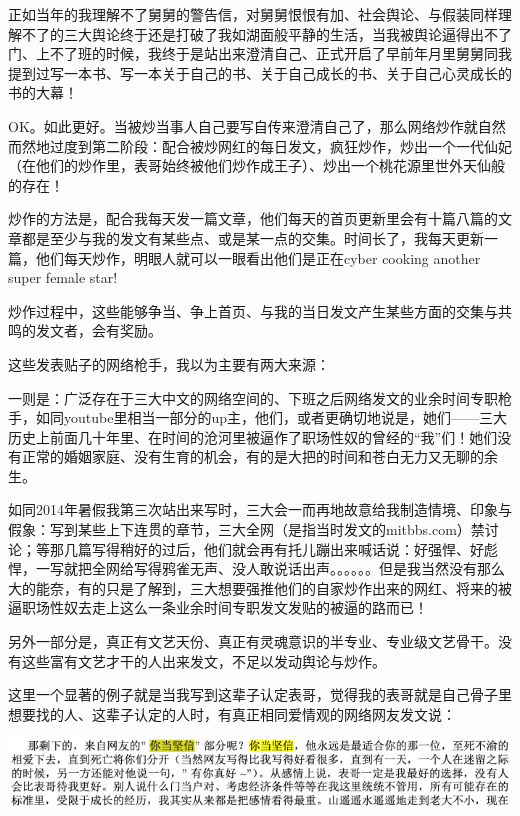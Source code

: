 \documentclass[9pt, b5paper]{article}
\begin{document}
正如当年的我理解不了舅舅的警告信，对舅舅恨恨有加、社会舆论、与假装同样理解不了的三大舆论终于还是打破了我如湖面般平静的生活，当我被舆论逼得出不了门、上不了班的时候，我终于是站出来澄清自己、正式开启了早前年月里舅舅同我提到过写一本书、写一本关于自己的书、关于自己成长的书、关于自己心灵成长的书的大幕！

OK。如此更好。当被炒当事人自己要写自传来澄清自己了，那么网络炒作就自然而然地过度到第二阶段：配合被炒网红的每日发文，疯狂炒作，炒出一个一代仙妃（在他们的炒作里，表哥始终被他们炒作成王子）、炒出一个桃花源里世外天仙般的存在！

炒作的方法是，配合我每天发一篇文章，他们每天的首页更新里会有十篇八篇的文章都是至少与我的发文有某些点、或是某一点的交集。时间长了，我每天更新一篇，他们每天炒作，明眼人就可以一眼看出他们是正在cyber cooking another super female star!

炒作过程中，这些能够争当、争上首页、与我的当日发文产生某些方面的交集与共鸣的发文者，会有奖励。 

这些发表贴子的网络枪手，我以为主要有两大来源：

一则是：广泛存在于三大中文的网络空间的、下班之后网络发文的业余时间专职枪手，如同youtube里相当一部分的up主，他们，或者更确切地说是，她们——三大历史上前面几十年里、在时间的沧河里被逼作了职场性奴的曾经的“我”们！她们没有正常的婚姻家庭、没有生育的机会，有的是大把的时间和苍白无力又无聊的余生。

如同2014年暑假我第三次站出来写时，三大会一而再地故意给我制造情境、印象与假象：写到某些上下连贯的章节，三大全网（是指当时发文的mitbbs.com）禁讨论；等那几篇写得稍好的过后，他们就会再有托儿蹦出来喊话说：好强悍、好彪悍，一写就把全网给写得鸦雀无声、没人敢说话出声。。。。。。但是我当然没有那么大的能奈，有的只是了解到，三大想要强推他们的自家炒作出来的网红、将来的被逼职场性奴去走上这么一条业余时间专职发文发贴的被逼的路而已！

另外一部分是，真正有文艺天份、真正有灵魂意识的半专业、专业级文艺骨干。没有这些富有文艺才干的人出来发文，不足以发动舆论与炒作。 

这里一个显著的例子就是当我写到这辈子认定表哥，觉得我的表哥就是自己骨子里想要找的人、这辈子认定的人时，有真正相同爱情观的网络网友发文说：

\begin{center}
\includegraphics[width=.9\linewidth]{./pic/backups_plans_20210412_165616.png}
\end{center}
\end{document}

